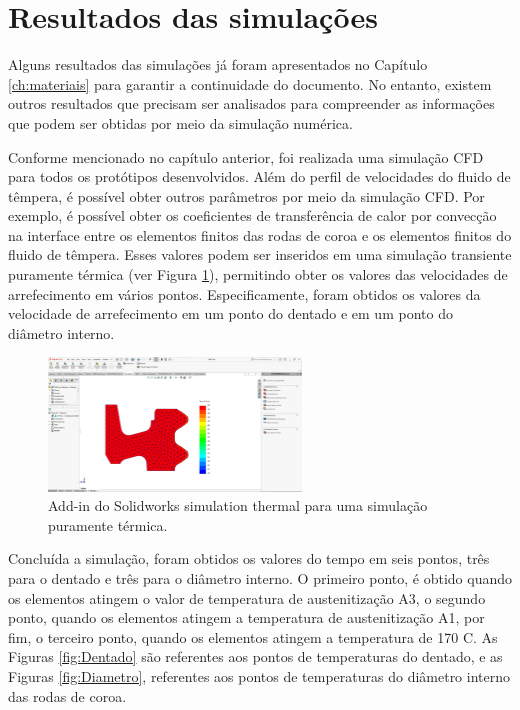 \section{Resultados das simulações} \label{sec:resultados_simulacoes}
Alguns resultados das simulações já foram apresentados no Capítulo \ref{ch:materiais} para garantir a continuidade do documento. No entanto, existem outros resultados que precisam ser analisados para compreender as informações que podem ser obtidas por meio da simulação numérica.
\par
Conforme mencionado no capítulo anterior, foi realizada uma simulação CFD para todos os protótipos desenvolvidos. Além do perfil de velocidades do fluido de têmpera, é possível obter outros parâmetros por meio da simulação CFD. Por exemplo, é possível obter os coeficientes de transferência de calor por convecção na interface entre os elementos finitos das rodas de coroa e os elementos finitos do fluido de têmpera. Esses valores podem ser inseridos em uma simulação transiente puramente térmica (ver Figura \ref{fig:simulacao_termica}), permitindo obter os valores das velocidades de arrefecimento em vários pontos. Especificamente, foram obtidos os valores da velocidade de arrefecimento em um ponto do dentado e em um ponto do diâmetro interno.
\begin{figure}[htb]
    \centering
    \includegraphics[width = 0.6\textwidth]{Figures/Cap4/Solidworks_thermal.png}
    \caption[Simulação puramente térmica Solidworks]%
    {Add-in do Solidworks simulation thermal para uma simulação puramente térmica.}
    \label{fig:simulacao_termica}
\end{figure}
\par
Concluída a simulação, foram obtidos os valores do tempo em seis pontos, três para o dentado e três para o diâmetro interno. O primeiro ponto, é obtido quando os elementos atingem o valor de temperatura de austenitização A3, o segundo ponto, quando os elementos atingem a temperatura de austenitização A1, por fim, o terceiro ponto, quando os elementos atingem a temperatura de 170 \textdegree C. As Figuras \ref{fig:Dentado} são referentes aos pontos de temperaturas do dentado, e as Figuras \ref{fig:Diametro}, referentes aos pontos de temperaturas do diâmetro interno das rodas de coroa.

